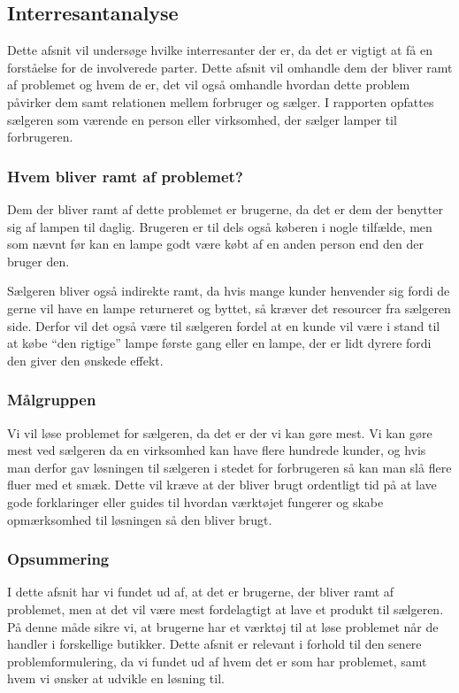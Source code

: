 \subsection{Interresantanalyse}

 Dette afsnit vil undersøge hvilke interresanter der er, da det er vigtigt at få en forståelse for de involverede parter. Dette afsnit vil omhandle dem der bliver ramt af problemet og hvem de er, det vil også omhandle hvordan dette problem påvirker dem samt relationen mellem forbruger og sælger. I rapporten opfattes sælgeren som værende en person eller virksomhed, der sælger lamper til forbrugeren. 

\subsubsection{Hvem bliver ramt af problemet?}
Dem der bliver ramt af dette problemet er brugerne, da det er dem der benytter sig af lampen til daglig. Brugeren er til dels også køberen i nogle tilfælde, men som nævnt før kan en lampe godt være købt af en anden person end den der bruger den.

Sælgeren bliver også indirekte ramt, da hvis mange kunder henvender sig fordi de gerne vil have en lampe returneret og byttet, så kræver det resourcer fra sælgeren side. Derfor vil det også være til sælgeren fordel at en kunde vil være i stand til at købe “den rigtige” lampe første gang eller en lampe, der er lidt dyrere fordi den giver den ønskede effekt.
 
\subsubsection{Målgruppen}
Vi vil løse problemet for sælgeren, da det er der vi kan gøre mest. Vi kan gøre mest ved sælgeren da en virksomhed kan have flere hundrede kunder, og hvis man derfor gav løsningen til sælgeren i stedet for forbrugeren så kan man slå flere fluer med et smæk. Dette vil kræve at der bliver brugt ordentligt tid på at lave gode forklaringer eller guides til hvordan værktøjet fungerer og skabe opmærksomhed til løsningen så den bliver brugt.
 
\subsubsection{Opsummering}
I dette afsnit har vi fundet ud af, at det er brugerne, der bliver ramt af problemet, men at det vil være mest fordelagtigt at lave et produkt til sælgeren. På denne måde sikre vi, at brugerne har et værktøj til at løse problemet når de handler i forskellige butikker. \newline Dette afsnit er relevant i forhold til den senere problemformulering, da vi fundet ud af hvem det er som har problemet, samt hvem vi ønsker at udvikle en løsning til. 